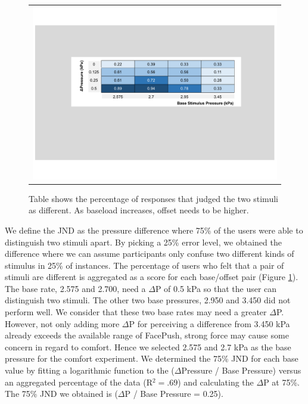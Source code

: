 \begin{figure}[h]
    \begin{center}
        \begin{tabular}{@{\hspace{0.1cm}}c}
            \includegraphics[width=1\linewidth]{figures/jnd}
        \end{tabular}
        \caption{Table shows the percentage of responses that judged the two stimuli as different. As baseload increases, offset needs to be higher.}
        \label{fig:jnd}
    \end{center}
\end{figure}

We define the JND as the pressure difference where 75\% of the users were able to distinguish two stimuli apart. By picking a 25\% error level, we obtained the difference where we can assume participants only confuse two different kinds of stimulus in 25\% of instances. The percentage of users who felt that a pair of stimuli are different is aggregated as a score for each base/offset pair (Figure \ref{fig:jnd}). The base rate, 2.575 and 2.700, need a $\Delta$P of 0.5 kPa so that the user can distinguish two stimuli. The other two base pressures, 2.950 and 3.450 did not perform well. We consider that these two base rates may need a greater $\Delta$P. However, not only adding more $\Delta$P for perceiving a difference from 3.450 kPa already exceeds the available range of FacePush, strong force may cause some concern in regard to comfort. Hence we selected 2.575 and 2.7 kPa as the base pressure for the comfort experiment. We determined the 75\% JND for each base value by fitting a logarithmic function to the ($\Delta$Pressure / Base Pressure) versus an aggregated percentage of the data (R$^2 = .69$) and calculating the $\Delta$P at 75\%. The 75\% JND we obtained is ($\Delta$P / Base Pressure = 0.25).

